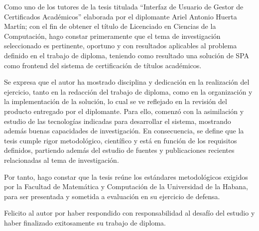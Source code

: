 \begin{opinion}
Como uno de los tutores de la tesis titulada ``Interfaz de Usuario de Gestor de Certificados Académicos'' elaborada por el diplomante Ariel Antonio Huerta Martín; con el fin de obtener el título de Licenciado en Ciencias de la Computación, hago constar primeramente que el tema de investigación seleccionado es pertinente, oportuno y con resultados aplicables al problema definido en el trabajo de diploma, teniendo como resultado una solución de SPA como frontend del sistema de certificación de títulos académicos.

Se expresa que el autor ha mostrado disciplina y dedicación en la realización del ejercicio, tanto en la redacción del trabajo de diploma, como en la organización y la implementación de la solución, lo cual se ve reflejado en la revisión del producto entregado por el diplomante. Para ello, comenzó con la asimilación y estudio de las tecnologías indicadas para desarrollar el sistema, mostrando además buenas capacidades de investigación.
En consecuencia, se define que la tesis cumple rigor metodológico, científico y está en función de los requisitos definidos, partiendo además del estudio de fuentes y publicaciones recientes relacionadas al tema de investigación.

Por tanto, hago constar que la tesis reúne los estándares metodológicos exigidos por la Facultad de Matemática y Computación de la Universidad de la Habana, para ser presentada y sometida a evaluación en su ejercicio de defensa.

Felicito al autor por haber respondido con responsabilidad al desafío del estudio y haber finalizado exitosamente su trabajo de diploma.

\begingroup
  \hspace{0.1cm}
  \hspace{0.1cm}
  \par
\endgroup

\end{opinion}